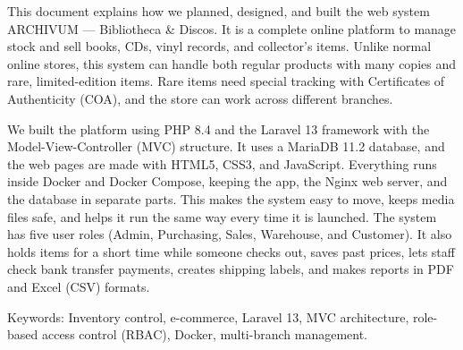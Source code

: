\begin{_abstract1}
This document explains how we planned, designed, and built the web system ARCHIVUM — Bibliotheca \& Discos. It is a complete online platform to manage stock and sell books, CDs, vinyl records, and collector's items. Unlike normal online stores, this system can handle both regular products with many copies and rare, limited-edition items. Rare items need special tracking with Certificates of Authenticity (COA), and the store can work across different branches.

We built the platform using PHP 8.4 and the Laravel 13 framework with the Model-View-Controller (MVC) structure. It uses a MariaDB 11.2 database, and the web pages are made with HTML5, CSS3, and JavaScript. Everything runs inside Docker and Docker Compose, keeping the app, the Nginx web server, and the database in separate parts. This makes the system easy to move, keeps media files safe, and helps it run the same way every time it is launched. The system has five user roles (Admin, Purchasing, Sales, Warehouse, and Customer). It also holds items for a short time while someone checks out, saves past prices, lets staff check bank transfer payments, creates shipping labels, and makes reports in PDF and Excel (CSV) formats.

Keywords: Inventory control, e-commerce, Laravel 13, MVC architecture, role-based access control (RBAC), Docker, multi-branch management.
\end{_abstract1}
